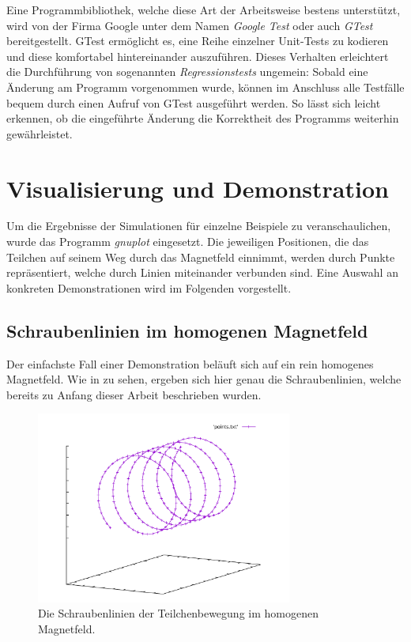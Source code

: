 Eine Programmbibliothek, welche diese Art der Arbeitsweise bestens unterst\"utzt, wird von der Firma Google unter dem Namen
\textit{Google Test}
oder auch \textit{GTest} bereitgestellt. GTest erm\"oglicht es, eine Reihe einzelner Unit-Tests zu kodieren und diese komfortabel
hintereinander auszuf\"uhren. Dieses Verhalten erleichtert die Durchf\"uhrung von sogenannten \textit{Regressionstests} ungemein:
Sobald eine \"Anderung am Programm vorgenommen wurde, k\"onnen im Anschluss alle Testf\"alle bequem durch einen Aufruf von GTest
ausgef\"uhrt werden. So l\"asst sich leicht erkennen, ob die eingef\"uhrte  \"Anderung die Korrektheit des Programms weiterhin
gew\"ahrleistet.

\section{Visualisierung und Demonstration}

Um die Ergebnisse der Simulationen f\"ur einzelne Beispiele zu veranschaulichen, wurde das Programm \textit{gnuplot} eingesetzt.
Die jeweiligen Positionen, die das Teilchen auf seinem Weg durch das Magnetfeld einnimmt, werden durch Punkte repr\"asentiert,
welche durch Linien miteinander verbunden sind. Eine Auswahl an konkreten Demonstrationen wird im Folgenden vorgestellt.

\subsection{Schraubenlinien im homogenen Magnetfeld}

Der einfachste Fall einer Demonstration bel\"auft sich auf ein rein homogenes Magnetfeld. Wie in  zu sehen,
ergeben sich hier genau die Schraubenlinien, welche bereits zu Anfang dieser Arbeit beschrieben wurden.

\begin{figure}[h]
  \centering
  \includegraphics[width=0.75\textwidth]{../gnuplot/homogeneous}
  \caption{Die Schraubenlinien der Teilchenbewegung im homogenen Magnetfeld.}
  \label{fig:homogeneous_plot}
\end{figure}

